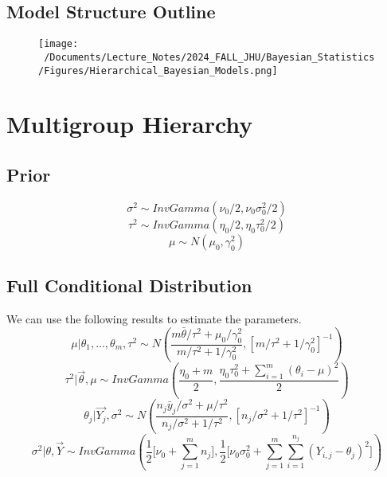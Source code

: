 \subsection*{Model Structure Outline}
\begin{figure}[H]
    \centering
    \texttt{[image: ~/Documents/Lecture\_Notes/2024\_FALL\_JHU/Bayesian\_Statistics/Figures/Hierarchical\_Bayesian\_Models.png]}
\end{figure}

\section{Multigroup Hierarchy}

\subsection*{Prior}
\begin{equation*}
    \sigma^2 \sim InvGamma(\nu_0/2, \nu_0\sigma_0^2/2)
\end{equation*}
\begin{equation*}
    \tau^2 \sim InvGamma(\eta_0/2, \eta_0\tau_0^2/2)
\end{equation*}
\begin{equation*}
    \mu \sim N(\mu_0, \gamma_0^2)
\end{equation*}

\subsection*{Full Conditional Distribution}
We can use the following results to estimate the parameters. 
\begin{equation*}
    \mu | \theta_1, \ldots, \theta_m, \tau^2 \sim N(\frac{m\bar{\theta}/\tau^2 + \mu_0/\gamma_0^2}{m/\tau^2 + 1/\gamma_0^2}, [m/\tau^2 + 1/\gamma_0^2]^{-1})
\end{equation*}
\begin{equation*}
    \tau^2 | \vec{\theta}, \mu \sim InvGamma(\frac{\eta_0 + m}{2}, \frac{\eta_0\tau_0^2 + \sum_{i=1}^{m}(\theta_i - \mu)^2}{2})
\end{equation*}
\begin{equation*}
    \theta_j | \vec{Y_j}, \sigma^2 \sim N(\frac{n_j\bar{y}_j/\sigma^2 + \mu/\tau^2}{n_j/\sigma^2 + 1/\tau^2}, [n_j/\sigma^2 + 1/\tau^2]^{-1})
\end{equation*}
\begin{equation*}
    \sigma^2 | \theta, \vec{Y} \sim InvGamma(\frac{1}{2}\big[\nu_0 + \sum_{j=1}^{m}n_j\big], \frac{1}{2}\big[\nu_0\sigma_0^2 + \sum_{j=1}^{m}\sum_{i=1}^{n_j}(Y_{i,j} - \theta_j)^2\big])
\end{equation*}
